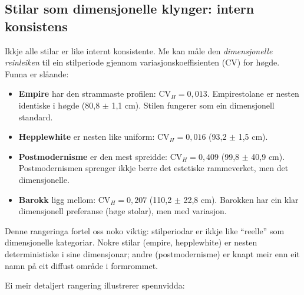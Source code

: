 \documentclass[10pt, a4paper, twocolumn]{article}
\begin{document}
\subsection{Stilar som dimensjonelle klynger: intern konsistens}

Ikkje alle stilar er like internt konsistente. Me kan måle den \emph{dimensjonelle reinleiken} til ein stilperiode gjennom variasjonskoeffisienten (CV) for høgde. Funna er slåande:

\begin{itemize}
  \item \textbf{Empire} har den strammaste profilen: $\text{CV}_H = 0{,}013$. Empirestolane er nesten identiske i høgde (80,8 $\pm$ 1,1 cm). Stilen fungerer som ein dimensjonell standard.
  \item \textbf{Hepplewhite} er nesten like uniform: $\text{CV}_H = 0{,}016$ (93,2 $\pm$ 1,5 cm).
  \item \textbf{Postmodernisme} er den mest spreidde: $\text{CV}_H = 0{,}409$ (99,8 $\pm$ 40,9 cm). Postmodernismen sprenger ikkje berre det estetiske rammeverket, men det dimensjonelle.
  \item \textbf{Barokk} ligg mellom: $\text{CV}_H = 0{,}207$ (110,2 $\pm$ 22,8 cm). Barokken har ein klar dimensjonell preferanse (høge stolar), men med variasjon.
\end{itemize}

Denne rangeringa fortel oss noko viktig: stilperiodar er ikkje like ``reelle'' som dimensjonelle kategoriar. Nokre stilar (empire, hepplewhite) er nesten deterministiske i sine dimensjonar; andre (postmodernisme) er knapt meir enn eit namn på eit diffust område i formrommet.

Ei meir detaljert rangering illustrerer spennvidda:
\end{document}
